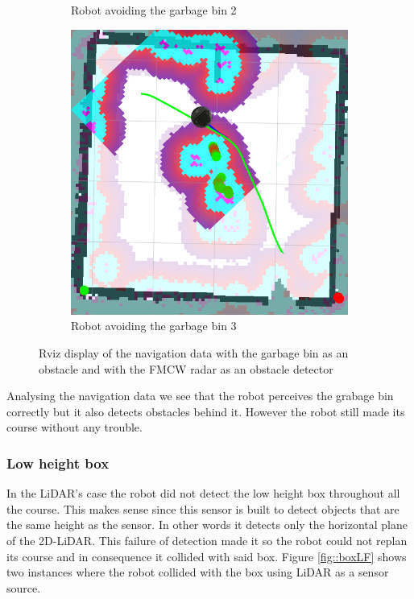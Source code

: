 \begin{figure}[ht!]
\begin{subfigure}[t]{0.3\linewidth}
    \caption{Robot avoiding the garbage bin 2}
    \label{fig::rvizgarbageradar2}
  \end{subfigure}
   \begin{subfigure}[t]{0.3\linewidth}
    \includegraphics[width=\linewidth]{imgs/chapter5/rvizgarbageradar2.png}
    \caption{Robot avoiding the garbage bin 3}
    \label{fig::rvizgarbageradar3}
  \end{subfigure}
  \caption{Rviz display of the navigation data with the garbage bin as an obstacle and with the \ac{FMCW} \ac{radar} as an obstacle detector}
  \label{fig:rvizgarbageradar}
\end{figure}
Analysing the navigation data we see that the robot perceives the grabage bin correctly but it also detects obstacles behind it. However the robot still made its course without any trouble.
\subsubsection{Low height box}

In the LiDAR's case the robot did not detect the low height box throughout all the course. This makes sense since this sensor is built to detect objects that are the same height as the sensor. In other words it detects only the horizontal plane of the 2D-\ac{LiDAR}. This failure of detection made it so the robot could not replan its course and in consequence it collided with said box. Figure \ref{fig::boxLF} shows two instances where the robot collided with the box using \ac{LiDAR} as a sensor source.

